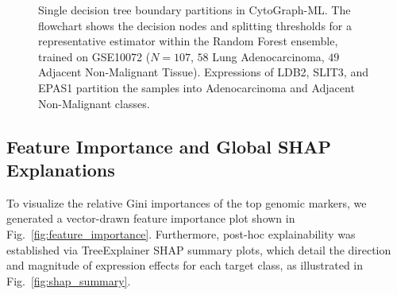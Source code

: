 \documentclass[journal,10pt]{IEEEtran}
\begin{document}
\begin{figure}[htbp]
\centering
{}
\caption{Single decision tree boundary partitions in CytoGraph-ML. The flowchart shows the decision nodes and splitting thresholds for a representative estimator within the Random Forest ensemble, trained on GSE10072 ($N=107$, $58$ Lung Adenocarcinoma, $49$ Adjacent Non-Malignant Tissue). Expressions of LDB2, SLIT3, and EPAS1 partition the samples into Adenocarcinoma and Adjacent Non-Malignant classes.}
\label{fig:tree_boundary}
\end{figure}

\subsection{Feature Importance and Global SHAP Explanations}
To visualize the relative Gini importances of the top genomic markers, we generated a vector-drawn feature importance plot shown in Fig.~\ref{fig:feature_importance}. Furthermore, post-hoc explainability was established via TreeExplainer SHAP summary plots, which detail the direction and magnitude of expression effects for each target class, as illustrated in Fig.~\ref{fig:shap_summary}.
\end{document}
